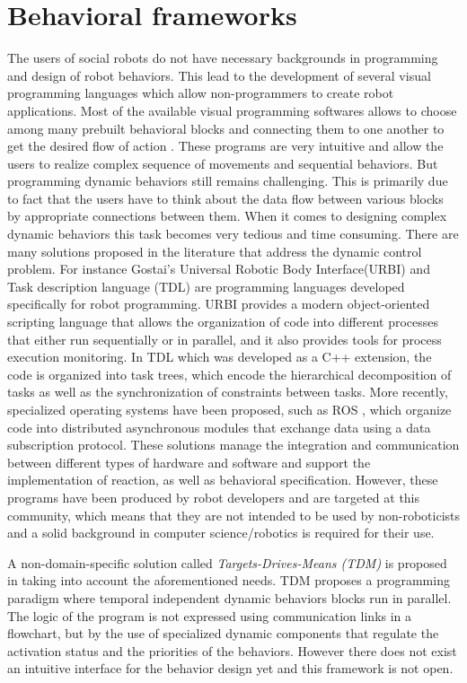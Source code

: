 \section{Behavioral frameworks} %
The users of social robots do not have necessary backgrounds in programming and design of robot behaviors. This lead to the development of several visual programming languages which allow non-programmers to create robot applications. Most of the available visual programming softwares allows to choose among many prebuilt behavioral blocks and connecting them to one another to get the desired flow of action \cite{MSRS4} \cite{Choregraphe}. These programs are very intuitive and allow the users to realize complex sequence of movements and sequential behaviors. But programming dynamic behaviors still remains challenging. This is primarily due to fact that the users have to think about the data flow between various blocks by appropriate connections between them. When it comes to designing complex dynamic behaviors this task becomes very tedious and time consuming. There are many solutions proposed in the literature that address the dynamic control problem. For instance Gostai's Universal Robotic Body Interface(URBI) \cite{baillie2008urbi} and Task description language (TDL) \cite{simmons1998task} are programming languages developed specifically for robot programming. URBI provides a modern object-oriented scripting language that allows the organization of code into different processes that either run sequentially or in parallel, and it also provides tools for process execution monitoring. In TDL which was developed as a C++ extension, the code is organized into task trees, which encode the hierarchical decomposition of tasks as well as the synchronization of constraints between tasks. More recently, specialized operating systems have been proposed, such as ROS \cite{quigley2009ros}, which organize code into distributed asynchronous modules that exchange data using a data subscription protocol. These solutions manage the integration and communication between different types of hardware and software and support the implementation of reaction, as well as behavioral specification. However, these programs have been produced by robot developers and are targeted at this community, which means that they are not intended to be used by non-roboticists and a solid background in computer science/robotics is required for their use.

A non-domain-specific solution called \emph{Targets-Drives-Means (TDM)} is proposed in \cite{berenz2014targets} taking into account the aforementioned needs. TDM proposes a programming paradigm where temporal independent dynamic behaviors blocks run in parallel. The logic of the program is not expressed using communication links in a flowchart, but by the use of specialized dynamic components that regulate the activation status and the priorities of the behaviors. However there does not exist an intuitive interface for the behavior design yet and this framework is not open.

